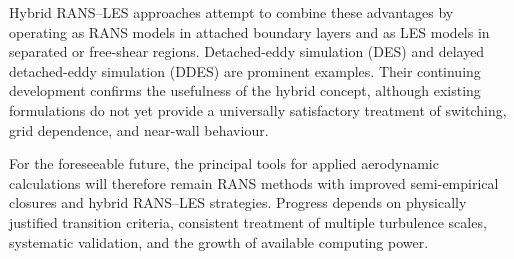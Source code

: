 Hybrid RANS--LES approaches attempt to combine these advantages by operating as RANS models in attached boundary layers and as LES models in separated or free-shear regions. Detached-eddy simulation (DES) and delayed detached-eddy simulation (DDES) are prominent examples. Their continuing development confirms the usefulness of the hybrid concept, although existing formulations do not yet provide a universally satisfactory treatment of switching, grid dependence, and near-wall behaviour.

For the foreseeable future, the principal tools for applied aerodynamic calculations will therefore remain RANS methods with improved semi-empirical closures and hybrid RANS--LES strategies. Progress depends on physically justified transition criteria, consistent treatment of multiple turbulence scales, systematic validation, and the growth of available computing power.
